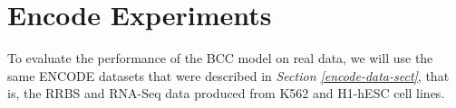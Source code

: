 \section{Encode Experiments} \label{integr-encode-exper-sect}
To evaluate the performance of the BCC model on real data, we will use the same ENCODE datasets that were described in \emph{Section \ref{encode-data-sect}}, that is, the RRBS and RNA-Seq data produced from K562 and H1-hESC cell lines.


